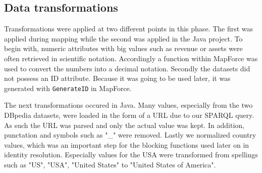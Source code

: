 \subsection{Data transformations}
Transformations were applied at two different points in this phase. The first was applied during mapping while the second was applied in the Java project. To begin with, numeric attributes with big values such as revenue or assets were often retrieved in scientific notation. Accordingly a function within MapForce was used to convert the numbers into a decimal notation. Secondly the datasets did not possess an ID attribute. Because it was going to be used later, it was generated with \texttt{GenerateID} in MapForce. 

The next transformations occured in Java. Many values, especially from the two DBpedia datasets, were loaded in the form of a URL due to our SPARQL query. As such the URL was parsed and only the actual value was kept. In addition, punctation and symbols such as "\_" were removed. Lastly we normalized country values, which was an important step for the blocking functions used later on in identity resolution. Especially values for the USA were transformed from spellings such as "US", "USA", "United States" to "United States of America".









